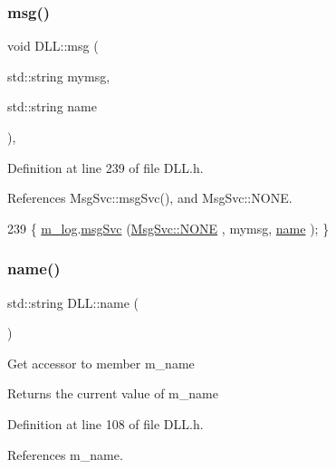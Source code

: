 \subsubsection{\texorpdfstring{msg()}{msg()}\hspace{0.1cm}{\footnotesize\ttfamily [2/2]}}
{\footnotesize\ttfamily void D\+L\+L\+::msg (\begin{DoxyParamCaption}\item[{std\+::string}]{mymsg,  }\item[{std\+::string}]{name }\end{DoxyParamCaption})\hspace{0.3cm}{\ttfamily [inline]}, {\ttfamily [private]}}



Definition at line 239 of file D\+L\+L.\+h.



References Msg\+Svc\+::msg\+Svc(), and Msg\+Svc\+::\+N\+O\+NE.


\begin{DoxyCode}
239 \{ \hyperlink{classDLL_a6e66cd993e2d142b48691557ce8e4047}{m\_log}.\hyperlink{classMsgSvc_ad25f18047920cc59a314e5098259711c}{msgSvc} (\hyperlink{classMsgSvc_ae671eb7301996cd049d2da8a65925926a9be9ae32fed8e1e6eba4a58692210fbd}{MsgSvc::NONE}    , mymsg, \hyperlink{classDLL_a0a915d538771dde2cb0580cd340ee088}{name} ); \}
\end{DoxyCode}
\mbox{\label{classDLL_a0a915d538771dde2cb0580cd340ee088}} 
\subsubsection{\texorpdfstring{name()}{name()}}
{\footnotesize\ttfamily std\+::string D\+L\+L\+::name (\begin{DoxyParamCaption}{ }\end{DoxyParamCaption})\hspace{0.3cm}{\ttfamily [inline]}}

Get accessor to member m\+\_\+name \begin{DoxyReturn}{Returns}
the current value of m\+\_\+name 
\end{DoxyReturn}


Definition at line 108 of file D\+L\+L.\+h.



References m\+\_\+name.




